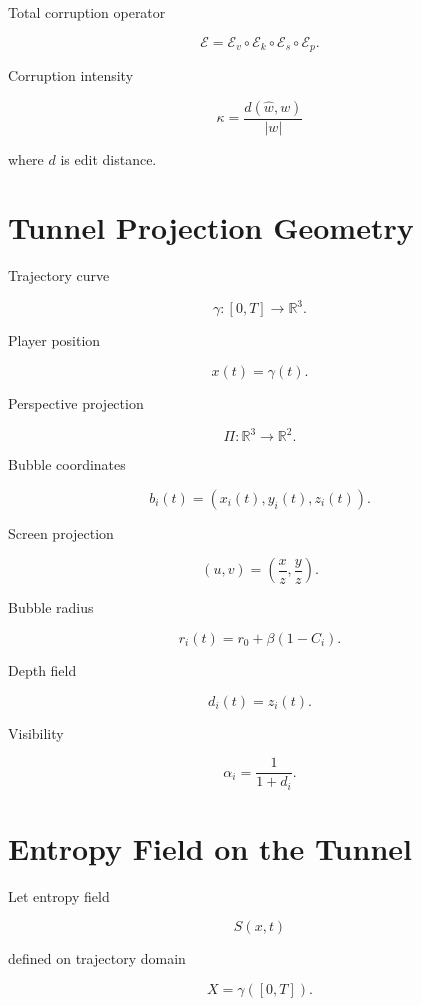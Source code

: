 \documentclass[11pt]{article}
\begin{document}
Total corruption operator

\[
\mathcal{E}
=
\mathcal{E}_v
\circ
\mathcal{E}_k
\circ
\mathcal{E}_s
\circ
\mathcal{E}_p.
\]

Corruption intensity

\[
\kappa = \frac{d(\hat{w},w)}{|w|}
\]

where $d$ is edit distance.


\section{Tunnel Projection Geometry}

Trajectory curve

\[
\gamma : [0,T] \to \mathbb{R}^3.
\]

Player position

\[
x(t) = \gamma(t).
\]

Perspective projection

\[
\Pi :
\mathbb{R}^3 \to \mathbb{R}^2.
\]

Bubble coordinates

\[
b_i(t) =
(x_i(t),y_i(t),z_i(t)).
\]

Screen projection

\[
(u,v) =
\left(
\frac{x}{z},
\frac{y}{z}
\right).
\]

Bubble radius

\[
r_i(t) =
r_0 + \beta (1-C_i).
\]

Depth field

\[
d_i(t) = z_i(t).
\]

Visibility

\[
\alpha_i =
\frac{1}{1+d_i}.
\]


\section{Entropy Field on the Tunnel}

Let entropy field

\[
S(x,t)
\]

defined on trajectory domain

\[
X = \gamma([0,T]).
\]
\end{document}
